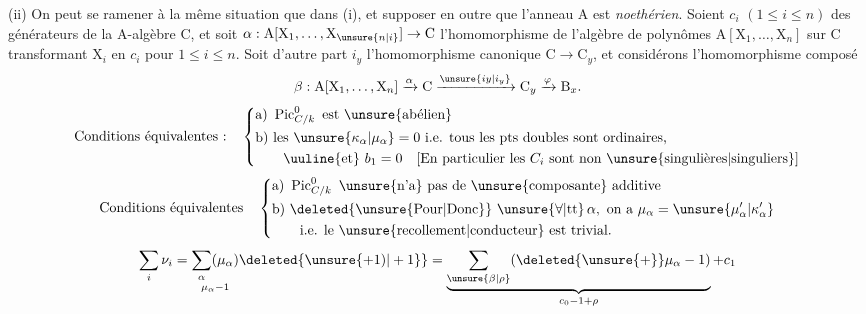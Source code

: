 (ii) On peut se ramener à la même situation que dans (i), et supposer en outre que l’anneau $\mathrm{A}$ est \textit{noethérien}. Soient $c_i$ $(1\leqslant i\leqslant n)$ des générateurs de la $\mathrm{A}$-algèbre $\mathrm{C}$, et soit $\alpha:\mathrm{A}[\mathrm{X}_1,\ldots,\mathrm{X}_{\unsure{n|i}}]\to \mathrm{C}$ l’homomorphisme de l’algèbre de polynômes $\mathrm{A}[\mathrm{X}_1,\ldots,\mathrm{X}_n]$ sur $\mathrm{C}$ transformant $\mathrm{X}_i$ en $c_i$ pour $1\leqslant i\leqslant n$. Soit d’autre part $i_y$ l’homomorphisme canonique $\mathrm{C}\to \mathrm{C}_y$, et considérons l’homomorphisme composé
\[
\beta:\mathrm{A}[\mathrm{X}_1,\ldots,\mathrm{X}_n]\xrightarrow{\alpha}\mathrm{C}\xrightarrow{\unsure{iy|i_y}}\mathrm{C}_y\xrightarrow{\varphi}\mathrm{B}_x.
\]
\[
\text{Conditions équivalentes :}\quad
\left\{\begin{aligned}
&\text{a) }\operatorname{Pic}^{0}_{C/k}\text{ est \unsure{abélien}}\\
&\text{b) les }\unsure{\kappa_{\alpha}|\mu_{\alpha}}=0\ \text{i.e. tous les pts doubles sont ordinaires,}\\
&\qquad\text{\uuline{et} }b_1=0\quad\text{[En particulier les }C_i\text{ sont non \unsure{singulières|singuliers}]}
\end{aligned}\right.
\]
\[
\text{Conditions équivalentes}\quad
\left\{\begin{aligned}
&\text{a) }\operatorname{Pic}^{0}_{C/k}\ \text{\unsure{n'a} pas de \unsure{composante} additive}\\
&\text{b) \deleted{\unsure{Pour|Donc}} }\unsure{\forall|\text{tt}}\,\alpha,\ \text{on a }\mu_{\alpha}=\unsure{\mu'_{\alpha}|\kappa'_{\alpha}}\\
&\qquad\text{i.e. le \unsure{recollement|conducteur} est trivial.}
\end{aligned}\right.
\]
\[
\sum_i\nu_i=\underset{\mu_{\alpha}-1}{\sum_{\alpha}(\mu_{\alpha})}\deleted{\unsure{+1)|+1}}
=\underbrace{\sum_{\unsure{\beta|\rho}}(\deleted{\unsure{+}}\mu_{\alpha}-1)}_{c_0-1+\rho}+c_1
\]
